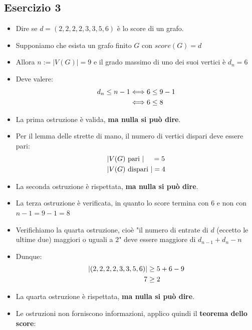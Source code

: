 \documentclass[10pt]{article}
\begin{document}
	\subsection{Esercizio 3}
	\begin{itemize}
	\item
	Dire se $d = (2,2,2,2,3,3,5,6)$ è lo score di un grafo.
	\item
	Supponiamo che esista un grafo finito $G$ con $score(G) = d$
	\item
	Allora $n := |V(G)| = 9$ e il grado massimo di uno dei suoi vertici è $d_n = 6$
	\item
	Deve valere:
	\begin{equation}
	\begin{split}
		d_n \leq n - 1 &\Longleftrightarrow 6 \leq 9 - 1  \\
		&\Longleftrightarrow 6 \leq 8
		\notag
		\end{split}
	\end{equation}
	\item
	La prima ostruzione è valida, \textbf{ma nulla si può dire}.
	\item
	Per il lemma delle strette di mano, il numero di vertici dispari deve essere pari:
	\begin{equation}
	\begin{split}
		|&V(G) \textrm{ pari }| \quad\, =  5\\
		|&V(G) \textrm{ dispari }| = 4 
		\notag
		\end{split}
	\end{equation}
	\item
	La seconda ostruzione è rispettata, \textbf{ma nulla si può dire}.
	\item
	La terza ostruzione è verificata, in quanto lo score termina con $6$ e non con $n-1 = 9 -1 = 8$
	\item
	Verifichiamo la quarta ostruzione, cioè "il numero di entrate di $d$ (eccetto le ultime due) maggiori o uguali a $2$" deve essere maggiore di $d_{n-1} + d_n - n$
	\item
	Dunque:
	\begin{equation}
	\begin{split}
		|(2,2,2,2,3,3,5,6)| &\geq 5+6-9 \\
		7 &\geq 2
		\notag
		\end{split}
	\end{equation}
	\item
	La quarta ostruzione è rispettata, \textbf{ma nulla si può dire}.
	\item
	Le ostruzioni non forniscono informazioni, applico quindi il \textbf{teorema dello score}:

\end{itemize}
\end{document}
